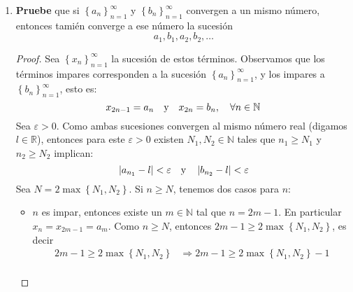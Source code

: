 \documentclass[12pt]{article}
\begin{document}
\begin{enumerate}
\begin{proof}
\begin{equation*}
\begin{split}
                    \Rightarrow \abs{a_n b_n}<&\varepsilon\\
                    \Rightarrow \abs{a_n b_n-0}<&\varepsilon\\
                \end{split}
            \end{equation*}
            Por la definición de límite, se tiene que
            \begin{equation*}
                \lim_{n\rightarrow\infty}a_n b_n = 0
            \end{equation*}
            \qed
        \end{proof}
    \item \textbf{Pruebe} que si $\left\{a_n\right\}_{n=1}^{\infty}$ y $\left\{b_n\right\}_{n=1}^{\infty}$ convergen a un mismo número, entonces tamién converge a ese número la sucesión
        \begin{equation*}
            a_1,b_1,a_2,b_2,\dots
        \end{equation*}
        \begin{proof}
            Sea $\left\{x_n\right\}_{n=1}^{\infty}$ la sucesión de estos términos. Observamos que los términos impares corresponden a la sucesión $\left\{a_n\right\}_{n=1}^{\infty}$, y los impares a $\left\{b_n\right\}_{n=1}^{\infty}$, esto es:
            \begin{equation*}
                x_{2n-1}=a_n\quad\textup{y}\quad x_{2n}=b_n,\quad \forall n\in\mathbb{N}
            \end{equation*}
            Sea $\varepsilon>0$. Como ambas sucesiones convergen al mismo número real (digamos $l\in\mathbb{R}$), entonces para este $\varepsilon>0$ existen $N_1,N_2\in\mathbb{N}$ tales que $n_1\geq N_1$ y $n_2\geq N_2$ implican:
            \begin{equation*}
                \left| a_{n_1}-l \right|<\varepsilon\quad\textup{y}\quad\left| b_{n_2}-l \right|<\varepsilon
            \end{equation*}
            Sea $N=2\max\left\{N_1,N_2\right\}$. Si $n\geq N$, tenemos dos casos para $n$:
            \begin{itemize}
                \item $n$ es impar, entonces existe un $m\in\mathbb{N}$ tal que $n=2m-1$. En particular $x_n=x_{2m-1}=a_m$. Como $n\geq N$, entonces $2m-1\geq2\max\left\{N_1,N_2\right\}$, es decir
                \begin{equation*}
                    \begin{split}
                        2m-1\geq2\max\left\{N_1,N_2\right\}&\Rightarrow2m-1\geq2\max\left\{N_1,N_2\right\}-1\\

\end{split}
\end{equation*}
\end{itemize}
\end{proof}
\end{enumerate}
\end{document}
